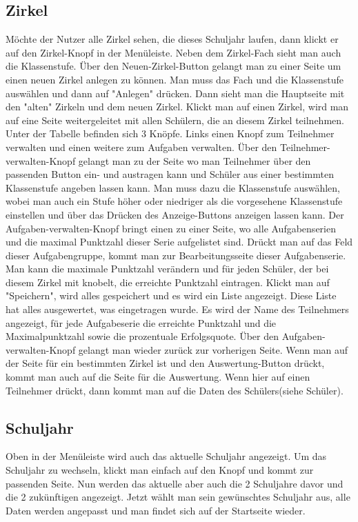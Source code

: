 \subsection{Zirkel}
Möchte der Nutzer alle Zirkel sehen, die dieses Schuljahr laufen, dann klickt er auf den Zirkel-Knopf in der Menüleiste. Neben dem Zirkel-Fach sieht man auch die Klassenstufe. Über den Neuen-Zirkel-Button gelangt man zu einer Seite um einen neuen Zirkel anlegen zu können. Man muss das Fach und die Klassenstufe auswählen und dann auf "Anlegen" drücken. Dann sieht man die Hauptseite mit den "alten" Zirkeln und dem neuen Zirkel. Klickt man auf einen Zirkel, wird man auf eine Seite weitergeleitet mit allen Schülern, die an diesem Zirkel teilnehmen. Unter der Tabelle befinden sich 3 Knöpfe. Links einen Knopf zum Teilnehmer verwalten und einen weitere zum Aufgaben verwalten. Über den Teilnehmer-verwalten-Knopf gelangt man zu der Seite wo man Teilnehmer über den passenden Button ein- und austragen kann und Schüler aus einer bestimmten Klassenstufe angeben lassen kann. Man muss dazu die Klassenstufe auswählen, wobei man auch ein Stufe höher oder niedriger als die vorgesehene Klassenstufe einstellen und über das Drücken des Anzeige-Buttons anzeigen lassen kann. Der Aufgaben-verwalten-Knopf bringt einen zu einer Seite, wo alle Aufgabenserien und die maximal Punktzahl dieser Serie aufgelistet sind. Drückt man auf das Feld dieser Aufgabengruppe, kommt man zur Bearbeitungsseite dieser Aufgabenserie. Man kann die maximale Punktzahl verändern und für jeden Schüler, der bei diesem Zirkel mit knobelt, die erreichte Punktzahl eintragen. Klickt man auf "Speichern", wird alles gespeichert und es wird ein Liste angezeigt. Diese Liste hat alles ausgewertet, was eingetragen wurde. Es wird der Name des Teilnehmers angezeigt, für jede Aufgabeserie die erreichte Punktzahl und die Maximalpunktzahl sowie die prozentuale Erfolgsquote. Über den Aufgaben-verwalten-Knopf gelangt man wieder zurück zur vorherigen Seite. Wenn man auf der Seite für ein bestimmten Zirkel ist und den Auswertung-Button drückt, kommt man auch auf die Seite für die Auswertung. Wenn hier auf einen Teilnehmer drückt, dann kommt man auf die Daten des Schülers(siehe Schüler).

\subsection{Schuljahr}
Oben in der Menüleiste wird auch das aktuelle Schuljahr angezeigt. Um das Schuljahr zu wechseln, klickt man einfach auf den Knopf und kommt zur passenden Seite. Nun werden das aktuelle aber auch die 2 Schuljahre davor und die 2 zukünftigen angezeigt. Jetzt wählt man sein gewünschtes Schuljahr aus, alle Daten werden angepasst und man findet sich auf der Startseite wieder.

